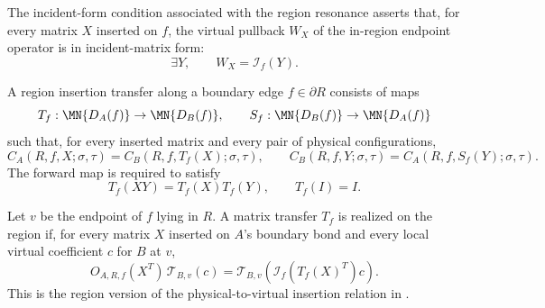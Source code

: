 \begin{definition}
    \label{def:peps_region_resonate_reconcile}
    \leanok
    The incident-form condition associated with the region resonance asserts that,
    for every matrix \(X\) inserted on \(f\), the virtual pullback \(W_X\) of the
    in-region endpoint operator is in incident-matrix form:
    \[
        \exists Y,\qquad W_X=\mathcal I_f(Y).
    \]
\end{definition}

\begin{definition}
    \label{def:peps_region_insertion_transfer}
    \leanok
    A region insertion transfer along a boundary edge $f\in\partial R$ consists
    of maps
    \[
        T_f:\MN{D_A(f)}\to\MN{D_B(f)},
        \qquad
        S_f:\MN{D_B(f)}\to\MN{D_A(f)}
    \]
    such that, for every inserted matrix and every pair of physical
    configurations,
    \[
        C_A(R,f,X;\sigma,\tau)
        =
        C_B(R,f,T_f(X);\sigma,\tau),
        \qquad
        C_B(R,f,Y;\sigma,\tau)
        =
        C_A(R,f,S_f(Y);\sigma,\tau).
    \]
    The forward map is required to satisfy
    \[
        T_f(XY)=T_f(X)T_f(Y),\qquad T_f(I)=I.
    \]
\end{definition}

\begin{definition}
    \label{def:peps_region_transfer_realizes}
    \leanok
    Let $v$ be the endpoint of $f$ lying in $R$.  A matrix transfer $T_f$ is
    realized on the region if, for every matrix $X$ inserted on $A$'s boundary
    bond and every local virtual coefficient $c$ for $B$ at $v$,
    \[
        O_{A,R,f}(X^T)\,\mathcal T_{B,v}(c)
        =
        \mathcal T_{B,v}\!\left(\mathcal I_f(T_f(X)^T)c\right).
    \]
    This is the region version of the physical-to-virtual insertion relation in
    \cite[Section~3, lines~254--582]{Molnar2018NormalPEPS}.
\end{definition}

